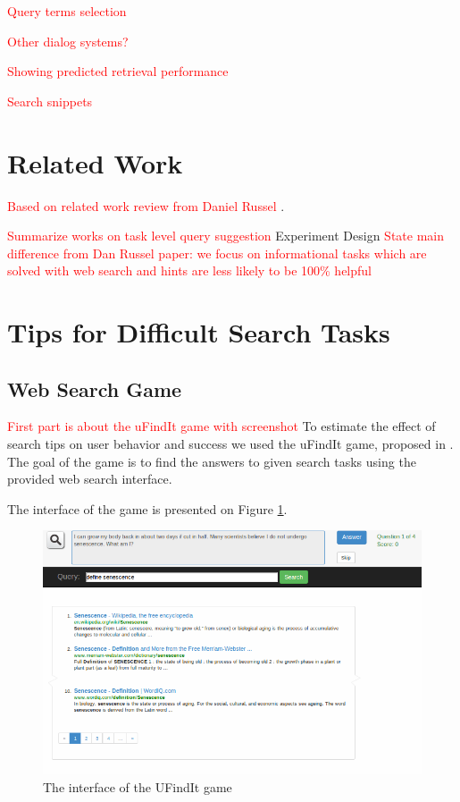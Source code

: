 \documentclass{sig-alternate}
\newcommand\todo[1]{\textcolor{red}{#1}}
\begin{document}
\todo{Query terms selection}

\todo{Other dialog systems?}

\todo{Showing predicted retrieval performance}

\todo{Search snippets}


\section{Related Work}
\todo{Based on related work review from Daniel Russel \cite{Moraveji:2011:MIU:2009916.2009966}}.

\todo{Summarize works on task level query suggestion}
Experiment Design
\todo{State main difference from Dan Russel paper: we focus on informational tasks which are solved with web search and hints are less likely to be 100\% helpful}

\section{Tips for Difficult Search Tasks}


\subsection{Web Search Game}
\todo{First part is about the uFindIt game with screenshot}
To estimate the effect of search tips on user behavior and success we used the uFindIt game, proposed in \cite{Ageev:2011:FYG:2009916.2009965}. The goal of the game is to find the answers to given search tasks using the provided web search interface. 

The interface of the game is presented on Figure \ref{figure:ufindit}.

\begin{figure}
\centering
\includegraphics[scale=0.33]{img/ufindit}
\caption{The interface of the UFindIt game}
\label{figure:ufindit}
\end{figure}
\end{document}
